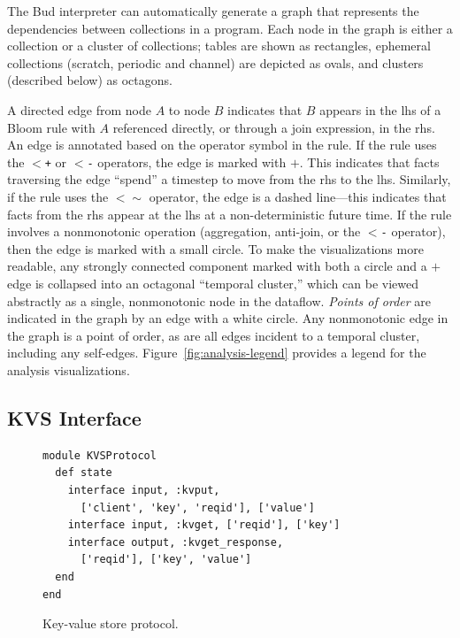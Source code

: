 The Bud interpreter can automatically generate a graph that represents the
dependencies between collections in a program. Each node in the graph is either
a collection or a cluster of collections; tables are shown as rectangles,
ephemeral collections (scratch, periodic and channel) are depicted as ovals, and
clusters (described below) as octagons.

A directed edge from node $A$ to node $B$ indicates that $B$ appears in the lhs
of a Bloom rule with $A$ referenced directly, or through a join expression, in
the rhs.  An edge is annotated based on the operator symbol in the rule. If the
rule uses the \texttt{$<$+} or \texttt{$<$-} operators, the edge is marked with
$+$. This indicates that facts traversing the edge ``spend'' a timestep to move
from the rhs to the lhs. Similarly, if the rule uses the \texttt{$<\sim$}
operator, the edge is a dashed line---this indicates that facts from the rhs
appear at the lhs at a non-deterministic future time. If the rule involves a
nonmonotonic operation (aggregation, anti-join, or the \texttt{$<$-} operator),
then the edge is marked with a small circle.  To make the visualizations more
readable, any strongly connected component marked with both a circle and a $+$
edge is collapsed into an octagonal ``temporal cluster,'' which can be viewed
abstractly as a single, nonmonotonic node in the dataflow. \emph{Points of
  order} are indicated in the graph by an edge with a white circle.  Any
nonmonotonic edge in the graph is a point of order, as are all edges incident to
a temporal cluster, including any self-edges.  Figure~\ref{fig:analysis-legend}
provides a legend for the analysis visualizations.

\subsection{KVS Interface}

\begin{figure}[t]
\begin{scriptsize}
\begin{lstlisting}
module KVSProtocol
  def state
    interface input, :kvput, 
      ['client', 'key', 'reqid'], ['value']
    interface input, :kvget, ['reqid'], ['key']
    interface output, :kvget_response, 
      ['reqid'], ['key', 'value']
  end
end
\end{lstlisting}
\centering
\vspace{-10pt}
\caption{Key-value store protocol.}
\label{fig:kvs-proto}
\end{scriptsize}
\vspace{-2pt}
\end{figure}

